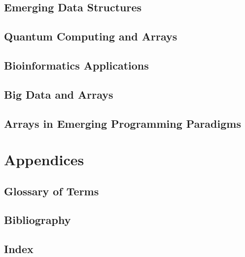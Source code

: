 \documentclass[12pt, oneside]{book}
\begin{document}
\section{Emerging Data Structures}
\section{Quantum Computing and Arrays}
\section{Bioinformatics Applications}
\section{Big Data and Arrays}
\section{Arrays in Emerging Programming Paradigms}
\chapter{Appendices}
\section{Glossary of Terms}
\section{Bibliography}
\section{Index}
\end{document}
